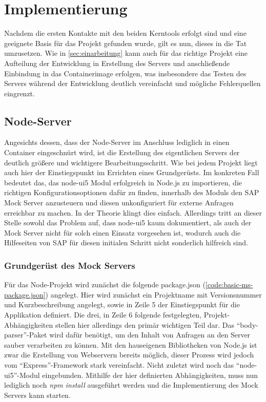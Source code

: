 \chapter{Implementierung}
Nachdem die ersten Kontakte mit den beiden Kerntools erfolgt sind und eine geeignete Basis für das Projekt gefunden wurde, gilt es nun, dieses in die Tat umzusetzen.
Wie in \autoref{sec:einarbeitung} kann auch für das richtige Projekt eine Aufteilung der Entwicklung in Erstellung des Servers und anschließende Einbindung in das Containerimage erfolgen, was insbesondere das Testen des Servers während der Entwicklung deutlich vereinfacht und mögliche Fehlerquellen eingrenzt.

\section{Node-Server}
Angesichts dessen, dass der Node-Server im Anschluss lediglich in einen Container eingeschnürt wird, ist die Erstellung des eigentlichen Servers der deutlich größere und wichtigere Bearbeitungsschritt.
Wie bei jedem Projekt liegt auch hier der Einstiegspunkt im Errichten eines Grundgerüsts.
Im konkreten Fall bedeutet das, das node-ui5 Modul erfolgreich in Node.js zu importieren, die richtigen Konfigurationsoptionen dafür zu finden, innerhalb des Moduls den SAP Mock Server anzusteuern und diesen unkonfiguriert für externe Anfragen erreichbar zu machen.
In der Theorie klingt dies einfach.
Allerdings tritt an dieser Stelle sowohl das Problem auf, dass node-ui5 kaum dokumentiert, als auch der Mock Server nicht für solch einen Einsatz vorgesehen ist, wodurch auch die Hilfeseiten von SAP für diesen initialen Schritt nicht sonderlich hilfreich sind.

\subsection{Grundgerüst des Mock Servers}
\label{subsec:foundation}
Für das Node-Projekt wird zunächst die folgende package.json (\autoref{code:basic-ms-package.json}) angelegt.
Hier wird zunächst ein Projektname mit Versionsnummer und Kurzbeschreibung angelegt, sowie in Zeile 5 der Einstiegspunkt für die Applikation definiert.
Die drei, in Zeile 6 folgende festgelegten, Projekt-Abhängigkeiten stellen hier allerdings den primär wichtigen Teil dar.
Das \enquote{body-parser}-Paket wird dafür benötigt, um den Inhalt von Anfragen an den Server sauber verarbeiten zu können.
Mit den hauseigenen Bibliotheken von Node.js ist zwar die Erstellung von Webservern bereits möglich, dieser Prozess wird jedoch vom \enquote{Express}-Framework stark vereinfacht.
Nicht zuletzt wird noch das \enquote{node-ui5}-Modul eingebunden.
Mithilfe der hier definierten Abhängigkeiten, muss nun lediglich noch \emph{npm install} ausgeführt werden und die Implementierung des Mock Servers kann starten.



